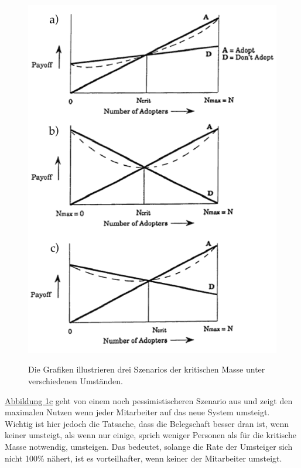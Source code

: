 \begin{figure}
	{\includegraphics[width=1\linewidth]{gfx/markusCriticalMass}}
\caption[Die kritische Masse \newline \citep{Markus:1990}]{Die Grafiken illustrieren drei Szenarios der kritischen Masse unter verschiedenen Umständen.}\label{fig:markusMass}
\end{figure}

\medskip \hyperref[fig:markusMass]{Abbildung \ref*{fig:markusMass}c} geht von einem noch pessimistischeren Szenario aus und zeigt den maximalen Nutzen wenn jeder Mitarbeiter auf das neue System umsteigt. Wichtig ist hier jedoch die Tatsache, dass die Belegschaft besser dran ist, wenn keiner umsteigt, als wenn nur einige, sprich weniger Personen als für die kritische Masse notwendig, umsteigen. Das bedeutet, solange die Rate der Umsteiger sich nicht 100\% nähert, ist es vorteilhafter, wenn keiner der Mitarbeiter umsteigt.

